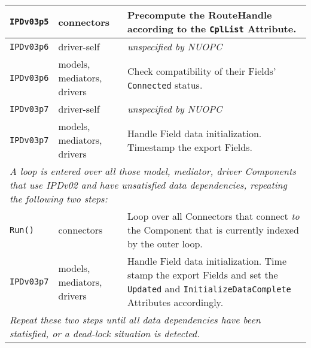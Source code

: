 \begin{longtable}[h]{|p{35mm}|p{4cm}|p{6cm}|}
     {\tt IPDv03p5} & connectors                  & Precompute the RouteHandle according to the {\tt CplList} Attribute.\\ \hline
     {\tt IPDv03p6} & driver-self                 & {\em unspecified by NUOPC}\\ \hline
     {\tt IPDv03p6} & models, mediators, drivers  & Check compatibility of their Fields' {\tt Connected} status.\\ \hline
     {\tt IPDv03p7} & driver-self                 & {\em unspecified by NUOPC}\\ \hline
     {\tt IPDv03p7} & models, mediators, drivers  & Handle Field data initialization. Timestamp the export Fields.\\ \hline
     \multicolumn{3}{|p{13.5cm}|}{\it A loop is entered over all those model, mediator, driver Components that use IPDv02 and have
     unsatisfied data dependencies, repeating the following two steps:}\\ \hline
     {\tt Run()}    & connectors                  & Loop over all Connectors that connect {\it to} the Component that is currently indexed by the outer loop.\\ \hline
     {\tt IPDv03p7} & models, mediators, drivers  & Handle Field data initialization. Time stamp the export Fields and set the {\tt Updated} and {\tt InitializeDataComplete} Attributes accordingly.\\ \hline
     \multicolumn{3}{|p{13.5cm}|}{\it Repeat these two steps until all data
     dependencies have been statisfied, or a dead-lock situation is detected.}\\ 
     \hline\hline
\end{longtable}

